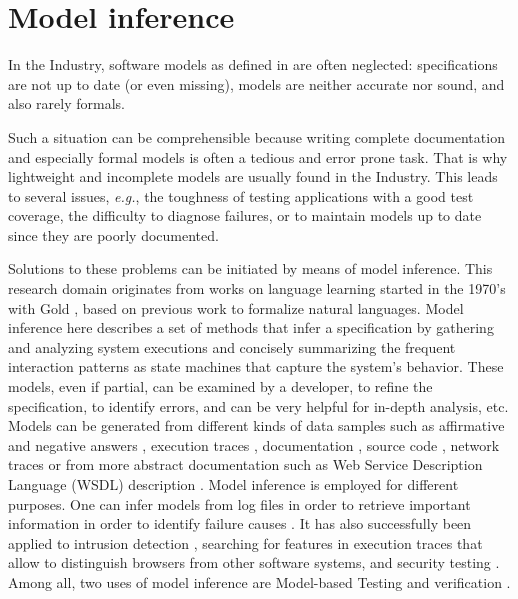\section{Model inference}
\label{sec:related:modelinf}

In the Industry, software models as defined in
 are
often neglected: specifications are not up to date (or even
missing), models are neither accurate nor sound, and also rarely
formals.

Such a situation can be comprehensible because writing complete
documentation and especially formal models is often a tedious and
error prone task. That is why lightweight and incomplete models
are usually found in the Industry. This leads to several issues,
\emph{e.g.}, the toughness of testing applications with a good test
coverage, the difficulty to diagnose failures, or to maintain
models up to date since they are poorly documented.

Solutions to these problems can be initiated by means of model
inference. This research domain originates from works on language
learning started in the 1970's with Gold \cite{Gold1978302}, based
on previous work to formalize natural languages. Model inference
here describes a set of methods that infer a specification by
gathering and analyzing system executions and concisely
summarizing the frequent interaction patterns as state machines
that capture the system's behavior. These models, even if
partial, can be examined by a developer, to refine the
specification, to identify errors, and can be very helpful for
in-depth analysis, etc. Models can be generated from different
kinds of data samples such as affirmative and negative answers
\cite{Angluin198787}, execution traces
\cite{Krka:2010:UDE:1810295.1810324}, documentation
\cite{ZhongZXM11}, source code
\cite{Salah05scenariographer,Pradel:2009}, network traces
\cite{6079839} or from more abstract documentation such as Web
Service Description Language (WSDL)
description \cite{Bertolino:2009:ASB:1595696.1595719}. Model
inference is employed for different purposes. One can infer
models from log files in order to retrieve important information
in order to identify failure causes \cite{4700316}. It has also
successfully been applied to intrusion detection \cite{debar00},
searching for features in execution traces that allow to
distinguish browsers from other software systems, and security
testing \cite{Groz2012}. Among all, two uses of model inference
are Model-based Testing
\cite{Lorenzoli2008,tap2011,MobiGUITARIEEESoftware2014} and
verification \cite{Ammons:2002:MS:565816.503275,groz2008modular}.

